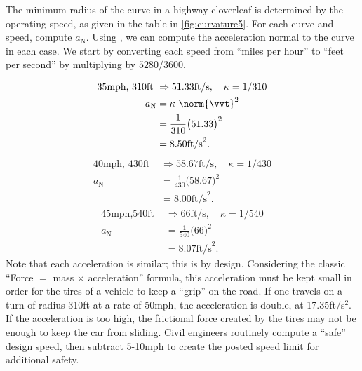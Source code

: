 \begin{example}\label{ex_curvature5}
The minimum radius of the curve in a highway cloverleaf is determined by the operating speed, as given in the table in \autoref{fig:curvature5}. For each curve and speed, compute $a_\text{N}$.
\solution
{}
Using , we can compute the acceleration normal to the curve in each case. We start by converting each speed from ``miles per hour'' to ``feet per second'' by multiplying by $5280/3600$.

\begin{align*}
\text{35mph, 310ft } &\Rightarrow 51.33\text{ft/s},\quad \kappa = 1/310 \\
			a_\text{N}&= \kappa\ \norm{\vvt}^2\\ 
							&= \frac1{310}\big(51.33\big)^2 \\
							&= 8.50\text{ft/s}^2.
\end{align*}
\begin{align*}
\text{40mph, 430ft } &\Rightarrow 58.67\text{ft/s},\quad \kappa = 1/430 \\
			a_\text{N}&= \frac1{430}\big(58.67\big)^2 \\
							&= 8.00\text{ft/s}^2.
\end{align*}
\begin{align*}
\text{45mph,540ft } &\Rightarrow 66\text{ft/s},\quad \kappa = 1/540 \\
			a_\text{N}&= \frac1{540}\big(66\big)^2 \\
							&= 8.07\text{ft/s}^2.
\end{align*}
Note that each acceleration is similar; this is by design. Considering the classic ``Force $=$ mass $\times$ acceleration'' formula, this acceleration must be kept small in order for the tires of a vehicle to keep a ``grip'' on the road. If one travels on a turn of radius 310ft at a rate of 50mph, the acceleration is double, at 17.35ft/s$^2$. If the acceleration is too high, the frictional force created by the tires may not be enough to keep the car from sliding. Civil engineers routinely compute a ``safe'' design speed, then subtract 5-10mph to create the posted speed limit for additional safety.
\end{example}

